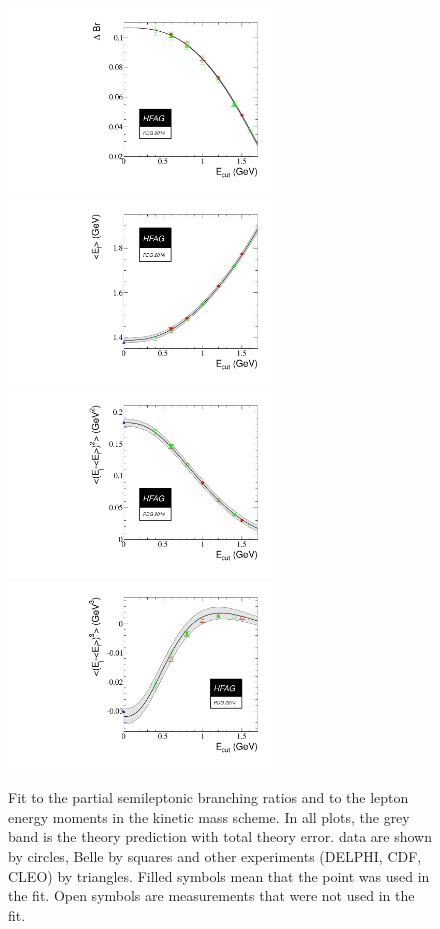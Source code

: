 \begin{figure}
\begin{center}
  \includegraphics[width=7cm]{figures/slb/e0_1.pdf}
  \includegraphics[width=7cm]{figures/slb/e1_1.pdf}\\
  \includegraphics[width=7cm]{figures/slb/e2_1.pdf}
  \includegraphics[width=7cm]{figures/slb/e3_1.pdf}
\end{center}
\caption{Fit to the partial semileptonic branching ratios and to the
  lepton energy moments in the kinetic mass scheme. In all plots, the
  grey band is the theory prediction with total theory error. \babar
  data are shown by circles, Belle by squares and other experiments
  (DELPHI, CDF, CLEO) by triangles. Filled symbols mean that the point
  was used in the fit. Open symbols are measurements that were not
  used in the fit.} \label{fig:gf_res_kin_el}
\end{figure}
